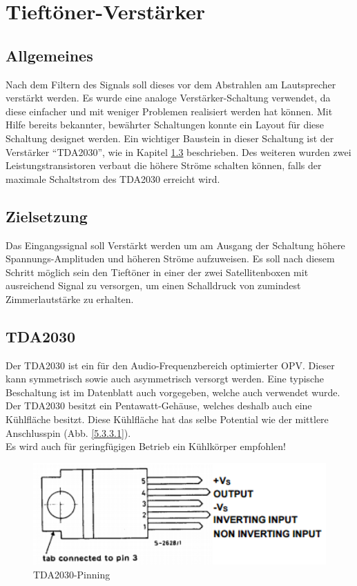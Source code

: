 \null\newpage
\section{Tieftöner-Verstärker}\label{kap:5.3}
\subsection{Allgemeines}\label{kap:5.3.1}
Nach dem Filtern des Signals soll dieses vor dem Abstrahlen am Lautsprecher verstärkt werden. Es wurde eine analoge Verstärker-Schaltung verwendet, da diese einfacher und mit weniger Problemen realisiert werden hat können. Mit Hilfe bereits bekannter, bewährter Schaltungen konnte ein Layout für diese Schaltung designet werden. Ein wichtiger Baustein in dieser Schaltung ist der Verstärker \enquote{TDA2030}, wie in Kapitel \ref{kap:5.3.3} beschrieben.  Des weiteren wurden zwei Leistungstransistoren verbaut die höhere Ströme schalten können, falls der maximale Schaltstrom des TDA2030 erreicht wird.

\subsection{Zielsetzung}\label{kap:5.3.2}
Das Eingangssignal soll Verstärkt werden um am Ausgang der Schaltung höhere Spannungs-Amplituden und höheren Ströme aufzuweisen. Es soll nach diesem Schritt möglich sein den Tieftöner in einer der zwei Satellitenboxen mit ausreichend Signal zu versorgen, um einen Schalldruck von zumindest Zimmerlautstärke zu erhalten. 

\subsection{TDA2030}\label{kap:5.3.3}
Der TDA2030 ist ein für den Audio-Frequenzbereich optimierter OPV. Dieser kann symmetrisch sowie auch asymmetrisch versorgt werden. Eine typische Beschaltung ist im Datenblatt auch vorgegeben, welche auch verwendet wurde. Der TDA2030 besitzt ein Pentawatt-Gehäuse, welches deshalb auch eine Kühlfläche besitzt. Diese Kühlfläche hat das selbe Potential wie der mittlere Anschlusspin (Abb. \ref{5.3.3.1}).\\
Es wird auch für geringfügigen Betrieb ein Kühlkörper empfohlen!
\begin{figure} [ht]
	\centering
	\includegraphics[width=1\textwidth]{img/Print5/TDA2030Pinning.PNG}
	\caption{TDA2030-Pinning}
	\label {fig:abb5.3.3.1}
\end{figure}
